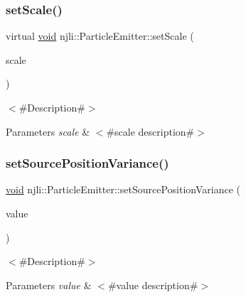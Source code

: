 \subsubsection{\texorpdfstring{set\+Scale()}{setScale()}\hspace{0.1cm}{\footnotesize\ttfamily [2/2]}}
{\footnotesize\ttfamily virtual \mbox{\hyperlink{_thread_8h_af1e856da2e658414cb2456cb6f7ebc66}{void}} njli\+::\+Particle\+Emitter\+::set\+Scale (\begin{DoxyParamCaption}\item[{const \mbox{\hyperlink{_util_8h_a5f6906312a689f27d70e9d086649d3fd}{f32}}}]{scale }\end{DoxyParamCaption})\hspace{0.3cm}{\ttfamily [virtual]}}

$<$\#\+Description\#$>$


\begin{DoxyParams}{Parameters}
{\em scale} & $<$\#scale description\#$>$ \\
\hline
\end{DoxyParams}
\mbox{\label{classnjli_1_1_particle_emitter_a26ca2463d9cc86ffcab132a54e86a930}} 
\subsubsection{\texorpdfstring{set\+Source\+Position\+Variance()}{setSourcePositionVariance()}}
{\footnotesize\ttfamily \mbox{\hyperlink{_thread_8h_af1e856da2e658414cb2456cb6f7ebc66}{void}} njli\+::\+Particle\+Emitter\+::set\+Source\+Position\+Variance (\begin{DoxyParamCaption}\item[{const bt\+Vector3 \&}]{value }\end{DoxyParamCaption})}

$<$\#\+Description\#$>$


\begin{DoxyParams}{Parameters}
{\em value} & $<$\#value description\#$>$ \\
\hline
\end{DoxyParams}
\mbox{\label{classnjli_1_1_particle_emitter_af58d78f577c600e69bba07e11f8d07ff}} 
